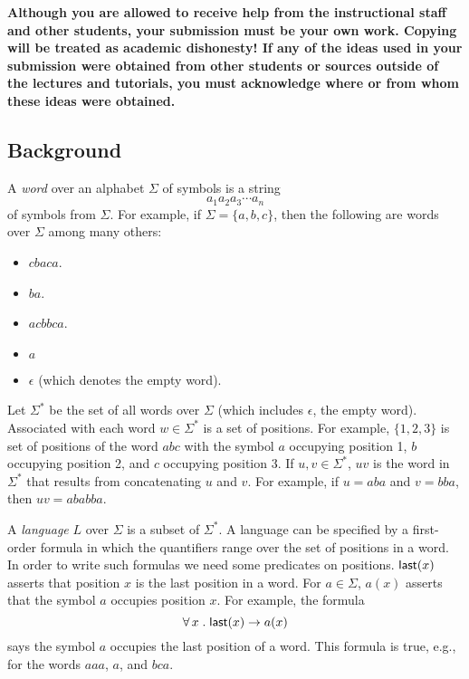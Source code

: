 \documentclass[11pt,fleqn]{article}
\newcommand{\bi}{\begin{itemize}}
\newcommand{\ei}{\end{itemize}}
\newcommand{\mname}[1]{\mbox{\sf #1}}
\newcommand{\ForallApp}{\forall\,}
\newcommand{\mdot}{\mathrel.}
\newcommand{\set}[1]{{\{ #1 \}}}
\begin{document}
\textbf{Although you are allowed to receive help from the
  instructional staff and other students, your submission must be your
  own work.  Copying will be treated as academic dishonesty! If any of
  the ideas used in your submission were obtained from other students
  or sources outside of the lectures and tutorials, you must
  acknowledge where or from whom these ideas were obtained.}

\subsection*{Background}

A \emph{word} over an alphabet $\Sigma$ of symbols is a string
\[a_1a_2a_3{\cdots}a_n\] of symbols from $\Sigma$.  For example, if $\Sigma
= \set{a,b,c}$, then the following are words over $\Sigma$ among many
others: \bi

  \item $cbaca$.

  \item $ba$.

  \item $acbbca$.

  \item $a$

  \item $\epsilon$ (which denotes the empty word).

\ei 

Let $\Sigma^*$ be the set of all words over $\Sigma$ (which includes
$\epsilon$, the empty word).  Associated with each word $w \in
\Sigma^*$ is a set of positions.  For example, $\set{1,2,3}$ is set of
positions of the word $abc$ with the symbol $a$ occupying position 1,
$b$ occupying position 2, and $c$ occupying position 3.  If $u,v \in
\Sigma^*$, $uv$ is the word in $\Sigma^*$ that results from
concatenating $u$ and $v$.  For example, if $u = aba$ and $v = bba$,
then $uv = ababba$.

A \emph{language} $L$ over $\Sigma$ is a subset of $\Sigma^*$.  A
language can be specified by a first-order formula in which the
quantifiers range over the set of positions in a word.  In order to
write such formulas we need some predicates on positions.
$\mname{last}(x)$ asserts that position $x$ is the last position in a
word.  For $a \in \Sigma$, $a(x)$ asserts that the symbol $a$ occupies
position $x$.  For example, the formula \[\ForallApp x \mdot
\mname{last}(x) \rightarrow a(x)\] says the symbol $a$ occupies the
last position of a word.  This formula is true, e.g., for the words
$aaa$, $a$, and $bca$.
\end{document}
